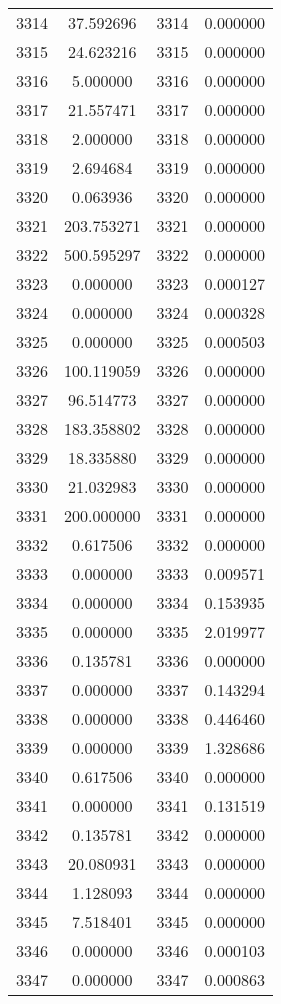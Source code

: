 \documentclass[12pt]{article}
\begin{document}
\begin{longtable}{@{}cccc@{}}
3314 & 37.592696 & 3314 & 0.000000 \\
3315 & 24.623216 & 3315 & 0.000000 \\
3316 & 5.000000 & 3316 & 0.000000 \\
3317 & 21.557471 & 3317 & 0.000000 \\
3318 & 2.000000 & 3318 & 0.000000 \\
3319 & 2.694684 & 3319 & 0.000000 \\
3320 & 0.063936 & 3320 & 0.000000 \\
3321 & 203.753271 & 3321 & 0.000000 \\
3322 & 500.595297 & 3322 & 0.000000 \\
3323 & 0.000000 & 3323 & 0.000127 \\
3324 & 0.000000 & 3324 & 0.000328 \\
3325 & 0.000000 & 3325 & 0.000503 \\
3326 & 100.119059 & 3326 & 0.000000 \\
3327 & 96.514773 & 3327 & 0.000000 \\
3328 & 183.358802 & 3328 & 0.000000 \\
3329 & 18.335880 & 3329 & 0.000000 \\
3330 & 21.032983 & 3330 & 0.000000 \\
3331 & 200.000000 & 3331 & 0.000000 \\
3332 & 0.617506 & 3332 & 0.000000 \\
3333 & 0.000000 & 3333 & 0.009571 \\
3334 & 0.000000 & 3334 & 0.153935 \\
3335 & 0.000000 & 3335 & 2.019977 \\
3336 & 0.135781 & 3336 & 0.000000 \\
3337 & 0.000000 & 3337 & 0.143294 \\
3338 & 0.000000 & 3338 & 0.446460 \\
3339 & 0.000000 & 3339 & 1.328686 \\
3340 & 0.617506 & 3340 & 0.000000 \\
3341 & 0.000000 & 3341 & 0.131519 \\
3342 & 0.135781 & 3342 & 0.000000 \\
3343 & 20.080931 & 3343 & 0.000000 \\
3344 & 1.128093 & 3344 & 0.000000 \\
3345 & 7.518401 & 3345 & 0.000000 \\
3346 & 0.000000 & 3346 & 0.000103 \\
3347 & 0.000000 & 3347 & 0.000863 \\

\end{longtable}
\end{document}
